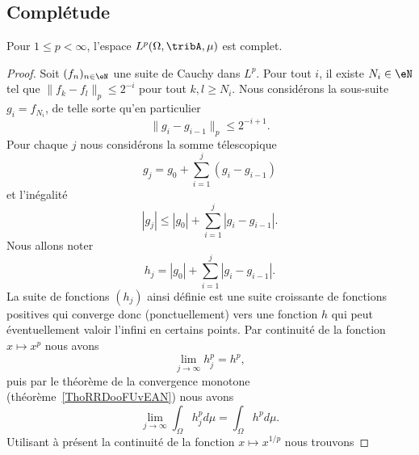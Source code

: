 \subsection{Complétude}

\begin{theorem}  \label{ThoUYBDWQX}
	Pour \( 1\leq p<\infty\), l'espace \( L^p(\Omega,\tribA,\mu)\) est complet.
\end{theorem}

\begin{proof}
	Soit \( (f_n)_{n\in\eN}\) une suite de Cauchy dans \( L^p\). Pour tout \( i\), il existe \( N_i\in\eN\) tel que \( \| f_k-f_l \|_p\leq 2^{-i}\) pour tout \( k,l\geq N_i\). Nous considérons la sous-suite \( g_i=f_{N_i}\), de telle sorte qu'en particulier
	\begin{equation}    \label{EqJLoDID}
		\|g_i-g_{i-1}\|_p\leq 2^{-i+1}.
	\end{equation}
	Pour chaque \( j\) nous considérons la somme télescopique
	\begin{equation}
		g_j=g_0+\sum_{i=1}^j(g_i-g_{i-1})
	\end{equation}
	et l'inégalité
	\begin{equation}
		| g_j |\leq | g_0 |+\sum_{i=1}^j| g_i-g_{i-1} |.
	\end{equation}
	Nous allons noter
	\begin{equation}        \label{EqSomPaFPQOWC}
		h_j=| g_0 |+\sum_{i=1}^j| g_i-g_{i-1} |.
	\end{equation}
	La suite de fonctions \( (h_j)\) ainsi définie est une suite croissante de fonctions positives qui converge donc (ponctuellement) vers une fonction \( h\) qui peut éventuellement valoir l'infini en certains points. Par continuité de la fonction \( x\mapsto x^p\) nous avons
	\begin{equation}
		\lim_{j\to \infty} h_j^p=h^p,
	\end{equation}
	puis par le théorème de la convergence monotone (théorème~\ref{ThoRRDooFUvEAN}) nous avons
	\begin{equation}
		\lim_{j\to \infty} \int_{\Omega}h_j^pd\mu=\int_{\Omega}h^pd\mu.
	\end{equation}
	Utilisant à présent la continuité de la fonction \( x\mapsto x^{1/p}\) nous trouvons

\end{proof}
